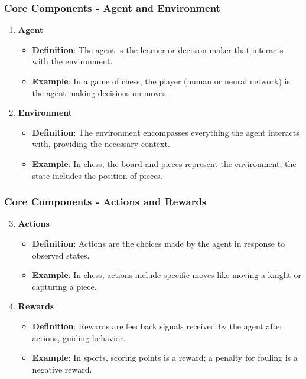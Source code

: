 \documentclass[aspectratio=169]{beamer}
\begin{document}
\begin{frame}[fragile]
  \frametitle{Core Components - Agent and Environment}
  \begin{enumerate}
    \item \textbf{Agent}
      \begin{itemize}
        \item \textbf{Definition}: The agent is the learner or decision-maker that interacts with the environment.
        \item \textbf{Example}: In a game of chess, the player (human or neural network) is the agent making decisions on moves.
      \end{itemize}
    
    \item \textbf{Environment}
      \begin{itemize}
        \item \textbf{Definition}: The environment encompasses everything the agent interacts with, providing the necessary context.
        \item \textbf{Example}: In chess, the board and pieces represent the environment; the state includes the position of pieces.
      \end{itemize}
  \end{enumerate}
\end{frame}

\begin{frame}[fragile]
  \frametitle{Core Components - Actions and Rewards}
  \begin{enumerate}
    \setcounter{enumi}{2} %
    \item \textbf{Actions}
      \begin{itemize}
        \item \textbf{Definition}: Actions are the choices made by the agent in response to observed states.
        \item \textbf{Example}: In chess, actions include specific moves like moving a knight or capturing a piece.
      \end{itemize}

    \item \textbf{Rewards}
      \begin{itemize}
        \item \textbf{Definition}: Rewards are feedback signals received by the agent after actions, guiding behavior.
        \item \textbf{Example}: In sports, scoring points is a reward; a penalty for fouling is a negative reward.
      \end{itemize}
  \end{enumerate}
\end{frame}
\end{document}
